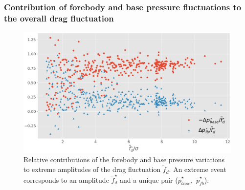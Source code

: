 \documentclass{jfm}
\newcommand{\EL}[1]{{\color{myred}{#1}}}
\begin{document}
\subsection{\EL{Extreme fluctuations of the instantaneous drag}}
\label{sec:instantaneous_drag}

\subsubsection{Contribution of forebody and base pressure fluctuations to the overall drag fluctuation}
\label{sec:forebody_and_base_contribution}

\begin{figure}
	\centering
	\includegraphics[width=.8\linewidth]{pressure_ratio/pressure_ratio.png}
	\caption{\label{fig:pressure_ratio} Relative contributions of the forebody and base pressure variations to extreme amplitudes of the drag fluctuation $\tilde f_d$. An extreme event corresponds to an amplitude $\tilde f^{\star}_d$ and a unique pair  ($\tilde{p}^{\star}_{base}$,~$\tilde{p}^{\star}_{fb}$).
	}
\end{figure}
\end{document}
